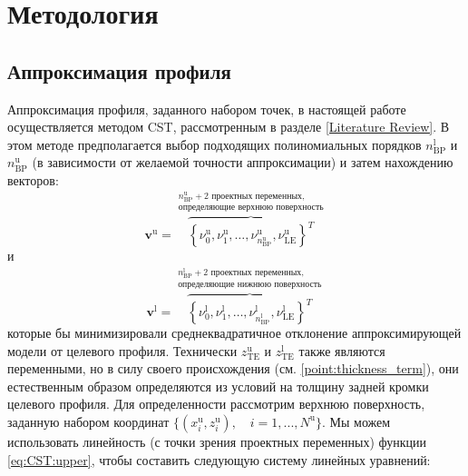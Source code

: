 \chapter{Методология}

\section{Аппроксимация профиля} \label{sect:Airfoil Approximation}

Аппроксимация профиля, заданного набором точек, в настоящей работе осуществляется методом CST, рассмотренным в разделе \ref{Literature Review}.
В этом методе предполагается выбор подходящих полиномиальных порядков $n^\text{l}_\text{BP}$ и $n^\text{u}_\text{BP}$ (в зависимости от желаемой точности аппроксимации) и затем нахождению векторов:
\begin{equation}\label{eq:set of upper coeffs}
  \mathbf{v}^\text{u} = \overbrace{ \left\{ \nu^\text{u}_0, \nu^\text{u}_1, \ldots, \nu^\text{u}_{n^\text{u}_{\text{BP}}}, \nu^\text{u}_{\text{LE}} \right\}^T }^
  {
    \substack{n^\text{u}_\text{BP} + \text{2 проектных переменных}, \\
              \text{определяющие верхнюю поверхность}}
  }
\end{equation}
и
\begin{equation*}
  \mathbf{v}^\text{l} = \overbrace{ \left\{ \nu^\text{l}_0, \nu^\text{l}_1, \ldots, \nu^\text{l}_{n^\text{l}_{\text{BP}}}, \nu^\text{l}_{\text{LE}} \right\}^T }^
  {
    \substack{n^\text{l}_\text{BP} + \text{2 проектных переменных}, \\
              \text{определяющие нижнюю поверхность}}
  }
\end{equation*}
которые бы минимизировали среднеквадратичное отклонение аппроксимирующей модели от целевого профиля. Технически $z^\text{u}_\text{TE}$ и $z^\text{l}_\text{TE}$ также являются переменными, но в силу своего происхождения (см. \ref{point:thickness_term}), они естественным образом определяются из условий на толщину задней кромки целевого профиля. Для определенности рассмотрим верхнюю поверхность, заданную набором координат $ \{(x^\text{u}_i, z^\text{u}_i) , \quad i = 1, ..., N^\text{u} \} $. Мы можем использовать линейность (с точки зрения проектных переменных) функции \ref{eq:CST:upper}, чтобы составить следующую систему линейных уравнений:

